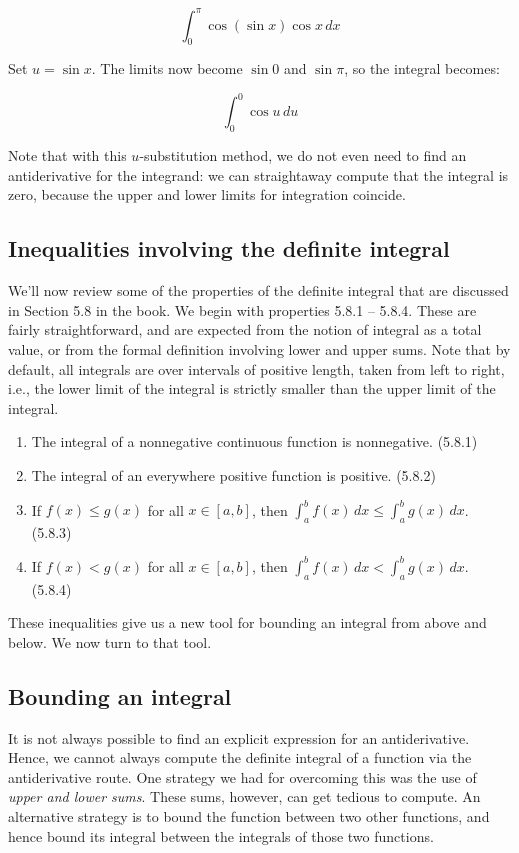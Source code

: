 \documentclass{amsart}
\begin{document}
$$\int_0^\pi \cos(\sin x) \cos x \, dx$$

Set $u = \sin x$. The limits now become $\sin 0$ and $\sin \pi$, so
the integral becomes:

$$\int_0^0 \cos u \, du$$

Note that with this $u$-substitution method, we do not even need to
find an antiderivative for the integrand: we can straightaway compute
that the integral is zero, because the upper and lower limits for
integration coincide.

\subsection{Inequalities involving the definite integral}

We'll now review some of the properties of the definite integral that
are discussed in Section 5.8 in the book. We begin with properties
5.8.1 -- 5.8.4. These are fairly straightforward, and are expected
from the notion of integral as a total value, or from the formal
definition involving lower and upper sums. Note that by default, all
integrals are over intervals of positive length, taken from left to
right, i.e., the lower limit of the integral is strictly smaller than
the upper limit of the integral.

\begin{enumerate}
\item The integral of a nonnegative continuous function is
  nonnegative. (5.8.1)
\item The integral of an everywhere positive function is
  positive. (5.8.2)
\item If $f(x) \le g(x)$ for all $x \in [a,b]$, then $\int_a^b f(x) \,
  dx \le \int_a^b g(x) \, dx$. (5.8.3)
\item If $f(x) < g(x)$ for all $x \in [a,b]$, then $\int_a^b f(x) \,
  dx < \int_a^b g(x) \, dx$. (5.8.4)
\end{enumerate}

These inequalities give us a new tool for bounding an integral from
above and below. We now turn to that tool.

\subsection{Bounding an integral}

It is not always possible to find an explicit expression for an
antiderivative. Hence, we cannot always compute the definite integral
of a function via the antiderivative route. One strategy we had for
overcoming this was the use of {\em upper and lower sums}. These sums,
however, can get tedious to compute. An alternative strategy is to
bound the function between two other functions, and hence bound its
integral between the integrals of those two functions.
\end{document}
